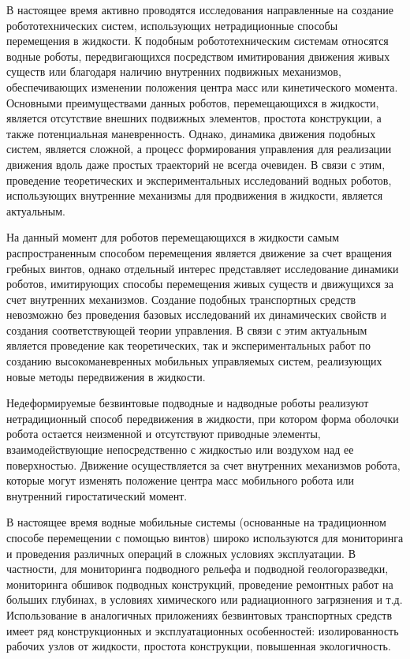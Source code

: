 
{\actuality} 

В настоящее время активно проводятся исследования направленные на создание робототехнических систем, использующих нетрадиционные способы перемещения в жидкости. К подобным робототехническим системам относятся водные роботы, передвигающихся посредством имитирования движения живых существ или благодаря наличию внутренних подвижных механизмов, обеспечивающих изменении положения центра масс или кинетического момента. Основными преимуществами данных роботов, перемещающихся в жидкости, является отсутствие внешних подвижных элементов, простота конструкции, а также потенциальная маневренность. Однако, динамика движения подобных систем, является сложной, а процесс формирования управления для реализации движения вдоль даже простых траекторий не всегда очевиден.  В связи с этим, проведение теоретических и экспериментальных исследований водных роботов, использующих внутренние механизмы для продвижения в жидкости, является актуальным.

На данный момент для роботов перемещающихся в жидкости самым распространенным способом перемещения является движение за счет вращения гребных винтов, однако отдельный интерес представляет исследование динамики роботов, имитирующих способы перемещения живых существ и движущихся за счет внутренних механизмов. Создание подобных транспортных средств невозможно без проведения базовых исследований их динамических свойств и создания соответствующей теории управления. В связи с этим актуальным является проведение как теоретических, так и экспериментальных работ по созданию высокоманевренных мобильных управляемых систем, реализующих новые методы передвижения в жидкости.

Недеформируемые безвинтовые подводные и надводные роботы реализуют нетрадиционный способ передвижения в жидкости, при котором форма оболочки робота остается неизменной и отсутствуют приводные элементы, взаимодействующие непосредственно с жидкостью или воздухом над ее поверхностью. Движение осуществляется за счет внутренних механизмов робота, которые могут изменять положение центра масс мобильного робота или внутренний гиростатический момент. 

В настоящее время водные мобильные системы (основанные на традиционном способе перемещении с помощью винтов) широко используются для мониторинга и проведения различных операций в сложных условиях эксплуатации. В частности, для мониторинга подводного рельефа и подводной геологоразведки, мониторинга обшивок подводных конструкций, проведение ремонтных работ на больших глубинах, в условиях химического или радиационного загрязнения и т.д. Использование в аналогичных приложениях безвинтовых транспортных средств имеет ряд конструкционных и эксплуатационных особенностей: изолированность рабочих узлов от жидкости, простота конструкции, повышенная экологичность.

